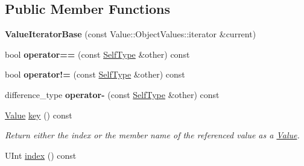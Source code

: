 \subsection*{Public Member Functions}
\begin{DoxyCompactItemize}
\item 
\hypertarget{class_json_1_1_value_iterator_base_a38e5d4351341621d69ec0647bebd6393}{{\bfseries Value\+Iterator\+Base} (const Value\+::\+Object\+Values\+::iterator \&current)}\label{class_json_1_1_value_iterator_base_a38e5d4351341621d69ec0647bebd6393}

\item 
\hypertarget{class_json_1_1_value_iterator_base_afc656672ac28502f640ade32c38c1b56}{bool {\bfseries operator==} (const \hyperlink{class_json_1_1_value_iterator_base}{Self\+Type} \&other) const }\label{class_json_1_1_value_iterator_base_afc656672ac28502f640ade32c38c1b56}

\item 
\hypertarget{class_json_1_1_value_iterator_base_a18c2dd42e0bb989ace141bfe9de52792}{bool {\bfseries operator!=} (const \hyperlink{class_json_1_1_value_iterator_base}{Self\+Type} \&other) const }\label{class_json_1_1_value_iterator_base_a18c2dd42e0bb989ace141bfe9de52792}

\item 
\hypertarget{class_json_1_1_value_iterator_base_ab786787fcad68ca5e8745aaf520fa17f}{difference\+\_\+type {\bfseries operator-\/} (const \hyperlink{class_json_1_1_value_iterator_base}{Self\+Type} \&other) const }\label{class_json_1_1_value_iterator_base_ab786787fcad68ca5e8745aaf520fa17f}

\item 
\hypertarget{class_json_1_1_value_iterator_base_a7fe8b45ba67da5f01dc54273242c5f46}{\hyperlink{class_json_1_1_value}{Value} \hyperlink{class_json_1_1_value_iterator_base_a7fe8b45ba67da5f01dc54273242c5f46}{key} () const }\label{class_json_1_1_value_iterator_base_a7fe8b45ba67da5f01dc54273242c5f46}

\begin{DoxyCompactList}\small\item\em Return either the index or the member name of the referenced value as a \hyperlink{class_json_1_1_value}{Value}. \end{DoxyCompactList}\item 
\hypertarget{class_json_1_1_value_iterator_base_a5671376c32cb0fb95cbe0934be3ea5af}{U\+Int \hyperlink{class_json_1_1_value_iterator_base_a5671376c32cb0fb95cbe0934be3ea5af}{index} () const }\label{class_json_1_1_value_iterator_base_a5671376c32cb0fb95cbe0934be3ea5af}


\end{DoxyCompactItemize}
